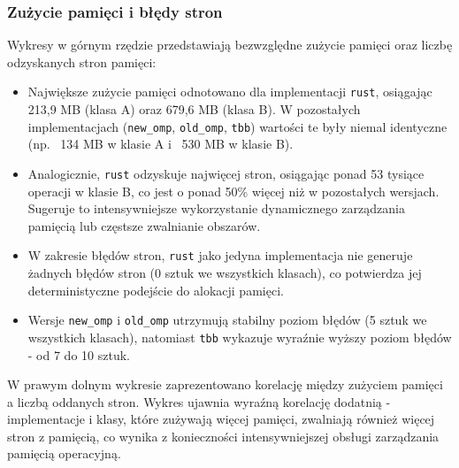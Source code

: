 \subsubsection{Zużycie pamięci i błędy stron}
Wykresy w górnym rzędzie przedstawiają bezwzględne zużycie pamięci oraz liczbę odzyskanych stron pamięci:
\begin{itemize}
    \item Największe zużycie pamięci odnotowano dla implementacji \texttt{rust}, osiągając 213,9 MB (klasa A) oraz 679,6 MB (klasa B). W pozostałych implementacjach (\texttt{new\_omp}, \texttt{old\_omp}, \texttt{tbb}) wartości te były niemal identyczne (np. ~134 MB w klasie A i ~530 MB w klasie B).
    \item Analogicznie, \texttt{rust} odzyskuje najwięcej stron, osiągając ponad 53 tysiące operacji w klasie B, co jest o ponad 50\% więcej niż w pozostałych wersjach. Sugeruje to intensywniejsze wykorzystanie dynamicznego zarządzania pamięcią lub częstsze zwalnianie obszarów.
    \item W zakresie błędów stron, \texttt{rust} jako jedyna implementacja nie generuje żadnych błędów stron (0 sztuk we wszystkich klasach), co potwierdza jej deterministyczne podejście do alokacji pamięci.
    \item Wersje \texttt{new\_omp} i \texttt{old\_omp} utrzymują stabilny poziom błędów (5 sztuk we wszystkich klasach), natomiast \texttt{tbb} wykazuje wyraźnie wyższy poziom błędów - od 7 do 10 sztuk.
\end{itemize}
W prawym dolnym wykresie zaprezentowano korelację między zużyciem pamięci a liczbą oddanych stron. Wykres ujawnia wyraźną korelację dodatnią - implementacje i klasy, które zużywają więcej pamięci, zwalniają również więcej stron z pamięcią, co wynika z konieczności intensywniejszej obsługi zarządzania pamięcią operacyjną.


